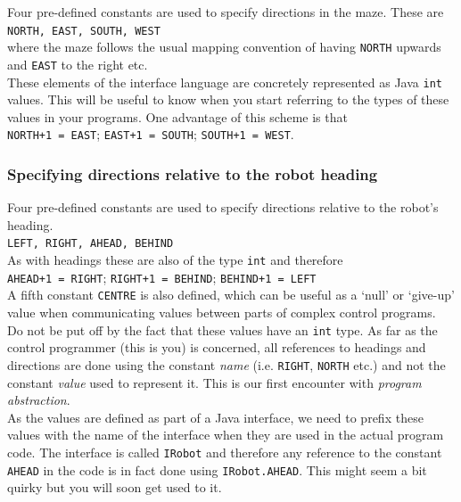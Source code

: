 Four pre-defined constants are used to specify directions in the
maze.  These are \\

{\tt NORTH, EAST, SOUTH, WEST} \\

\noindent
where the maze follows the usual mapping convention of having {\tt NORTH} 
upwards and {\tt EAST} to the right etc. \\

\noindent
These elements of the interface 
language are concretely represented as Java {\tt int} values. This will 
be useful to know when you start referring to the types of these values in
your programs. One advantage of this scheme is that \\

{\tt NORTH+1 = EAST}; {\tt EAST+1 = SOUTH}; {\tt SOUTH+1 = WEST}.

\subsubsection{Specifying directions relative to the robot heading}

Four pre-defined constants are used to specify directions
relative to the robot's heading. \\

{\tt LEFT, RIGHT, AHEAD, BEHIND}\\

\noindent
As with headings these are also of the type {\tt int} and therefore \\

{\tt AHEAD+1 = RIGHT}; {\tt RIGHT+1 = BEHIND}; {\tt BEHIND+1 = LEFT} \\

\noindent
A fifth constant {\tt CENTRE} is also defined, which can be useful as a
`null' or `give-up' value when communicating values between parts of
complex control programs.\\

\noindent
Do not be put off by the fact that these values have an {\tt int} type.
As far as the control
programmer (this is you) is concerned, all references to headings and
directions are done using the constant {\em name} (i.e. {\tt RIGHT}, 
{\tt NORTH} etc.) 
and not the constant {\em value} used to represent it. This is our first
encounter with {\em program abstraction}. \\

\noindent
As the values are defined as part of a Java interface,
we need to prefix these values with the name of the interface when they are
used in the actual program code. The interface is called {\tt IRobot} and 
therefore any reference to the constant {\tt AHEAD} in the code is in fact 
done using {\tt IRobot.AHEAD}. This might seem a bit quirky but you will 
soon get used to it. 


